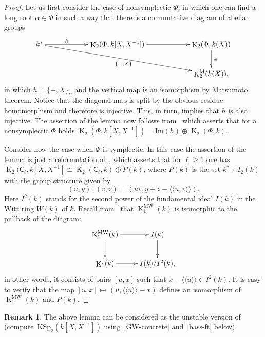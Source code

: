 \documentclass[oneside, 8pt]{amsart}
\theoremstyle{remark}
\theoremstyle{definition}
\numberwithin{lemma}{section}
\numberwithin{prop}{section}
\numberwithin{corollary}{section}
\numberwithin{externaltheorem}{section}
\newtheorem{rem}[lemma]{Remark}
\DeclareMathOperator{\K}{K}
\newcommand{\inv}{^{-1}}
\newcommand{\rC}{\mathsf{C}}
\numberwithin{equation}{section}
\begin{document}
\begin{proof} Let us first consider the case of nonsymplectic $\Phi$, in which one can find a long root $\alpha\in \Phi$ in such a way that there is a commutative diagram of abelian groups
\[\xymatrixcolsep{5pc}\xymatrix{k^* \ar[r]^-{h} \ar[rrd]_{\{-, X\}} & \K_2(\Phi, k[X, X^{-1}]) \ar[r] & \K_2(\Phi, k(X)) \ar[d]^{\cong} \\
                                                                                      &                                 & \K_2^\mathrm{M}(k(X)),} \]
in which $h = \{ -, X \}_{\alpha}$ and the vertical map is an isomorphism by Matsumoto theorem.
Notice that the diagonal map is split by the obvious residue homomorphism and therefore is injective. This, in turn, implies that $h$ is also injective.
The assertion of the lemma now follows from~\cite[Satz~3]{Hur77} which asserts that for a nonsymplectic $\Phi$ holds $\K_2(\Phi, k[X, X\inv]) = \mathrm{Im}(h) \oplus \K_2(\Phi, k)$.

Consider now the case when $\Phi$ is symplectic. In this case the assertion of the lemma is just a reformulation of~\cite[Theorem~B]{MR91},
which asserts that for $\ell \geq 1$ one has $\K_2(\rC_\ell, k[X, X\inv] \cong \K_2(\rC_\ell, k) \oplus P(k)$, where
$P(k)$ is the set $k^* \times I_2(k)$ with the group structure given by
\[ (u, y) \cdot (v, z) = (uv, y + z - \langle\langle u, v\rangle\rangle).\]
Here $I^2(k)$ stands for the second power of the fundamental ideal $I(k)$ in the Witt ring $W(k)$ of $k$.
Recall from~\cite{Mo04} that $\K_1^\mathrm{MW}(k)$ is isomorphic to the pullback of the diagram:
\[ \xymatrix{ \K_1^\mathrm{MW}(k) \ar[r] \ar[d] & I(k) \ar[d] \\ \K_1(k) \ar[r] & I(k)/I^2(k), } \]
in other words, it consists of pairs $[u, x]$ such that $x - \langle \langle u \rangle \rangle \in I^2(k)$.
It is easy to verify that the map $[u, x] \mapsto (u, \langle\langle u \rangle\rangle - x)$ defines an isomorphism of $\K_1^\mathrm{MW}(k)$ and $P(k)$. \end{proof}

\begin{rem} The above lemma can be considered as the unstable version of~\cite[Lemma~4.1.1]{AF17} (compute~$\mathrm{KSp}_2(k[X, X\inv])$ using~\eqref{GW-concrete} and~\cref{bass-ft} below). \end{rem}
\end{document}
